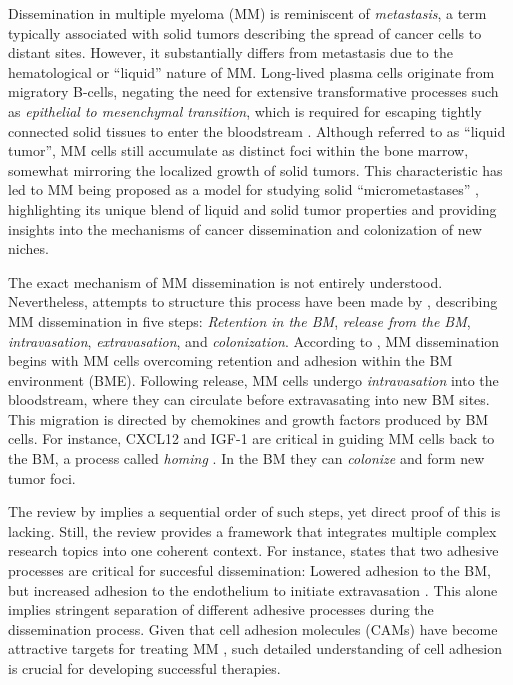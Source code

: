 Dissemination in multiple myeloma (MM) is reminiscent of \emph{metastasis}, a
term typically associated with solid tumors describing the spread of cancer
cells to distant sites. However, it substantially differs from metastasis due to
the hematological or ``liquid'' nature of MM. Long-lived plasma cells originate
from migratory B-cells, negating the need for extensive transformative processes
such as \emph{epithelial to mesenchymal transition}, which is required for
escaping tightly connected solid tissues to enter the bloodstream
\cite{ribattiEpithelialMesenchymalTransitionCancer2020}. Although referred to as
``liquid tumor'', MM cells still accumulate as distinct foci within the bone
marrow, somewhat mirroring the localized growth of solid tumors. This
characteristic has led to MM being proposed as a model for studying solid
``micrometastases'' \cite{ghobrialMyelomaModelProcess2012}, highlighting its
unique blend of liquid and solid tumor properties and providing insights into
the mechanisms of cancer dissemination and colonization of new niches.

The exact mechanism of MM dissemination is not entirely understood.
Nevertheless, attempts to structure this process have been made by
\citet{zeissigTumourDisseminationMultiple2020}, describing MM dissemination in
five steps: \emph{Retention in the BM}, \emph{release from the BM},
\emph{intravasation}, \emph{extravasation}, and \emph{colonization}. According
to \citet{zeissigTumourDisseminationMultiple2020}, MM dissemination begins with
MM cells overcoming retention and adhesion within the BM environment (BME).
Following release, MM cells undergo \emph{intravasation} into the bloodstream,
where they can circulate before extravasating into new BM sites. This migration
is directed by chemokines and growth factors produced by BM cells. For instance,
CXCL12 and IGF-1 are critical in guiding MM cells back to the BM, a process
called \emph{homing} \cite{vandebroekExtravasationHomingMechanisms2008}. In the
BM they can \emph{colonize} and form new tumor foci.

The review by \citet{zeissigTumourDisseminationMultiple2020} implies a
sequential order of such steps, yet direct proof of this is lacking. Still, the
review provides a framework that integrates multiple complex research topics
into one coherent context. For instance,
\citet{zeissigTumourDisseminationMultiple2020} states that two adhesive
processes are critical for succesful dissemination: Lowered adhesion to the BM,
but increased adhesion to the endothelium to initiate extravasation
\cite{asosinghUniquePathwayHoming2001a,
mrozikTherapeuticTargetingNcadherin2015}. This alone implies stringent
separation of different adhesive processes during the dissemination process.
Given that cell adhesion molecules (CAMs) have become attractive targets for
treating MM \cite{bouzerdanAdhesionMoleculesMultiple2022,
katzAdhesionMoleculesLifelines2010}, such detailed understanding of cell
adhesion is crucial for developing successful therapies.


